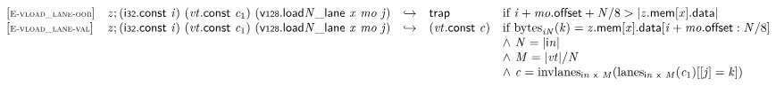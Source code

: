 \vspace{1ex}

$$
\begin{array}{@{}l@{}lcl@{}l@{}}
{[\textsc{\scriptsize E{-}vload\_lane{-}oob}]} \quad & {\mathit{z}} ; (\mathsf{i{\scriptstyle32}}.\mathsf{const}~{\mathit{i}})~({\mathit{vt}}.\mathsf{const}~{\mathit{c}}_{{1}})~({{{\mathsf{v{\scriptstyle128}.load}}{{\mathit{N}}}}{\mathsf{\_}}}{\mathsf{lane}}~{\mathit{x}}~{\mathit{mo}}~{\mathit{j}}) &\hookrightarrow& \mathsf{trap} &\quad
  \mbox{if}~{\mathit{i}} + {\mathit{mo}}.\mathsf{offset} + {\mathit{N}} / 8 > {|{{\mathit{z}}.\mathsf{mem}}{[{\mathit{x}}]}.\mathsf{data}|} \\
{[\textsc{\scriptsize E{-}vload\_lane{-}val}]} \quad & {\mathit{z}} ; (\mathsf{i{\scriptstyle32}}.\mathsf{const}~{\mathit{i}})~({\mathit{vt}}.\mathsf{const}~{\mathit{c}}_{{1}})~({{{\mathsf{v{\scriptstyle128}.load}}{{\mathit{N}}}}{\mathsf{\_}}}{\mathsf{lane}}~{\mathit{x}}~{\mathit{mo}}~{\mathit{j}}) &\hookrightarrow& ({\mathit{vt}}.\mathsf{const}~{\mathit{c}}) &\quad
  \mbox{if}~{{\mathrm{bytes}}}_{{{\mathit{i}}}{{\mathit{N}}}}({\mathit{k}}) = {{\mathit{z}}.\mathsf{mem}}{[{\mathit{x}}]}.\mathsf{data}[{\mathit{i}} + {\mathit{mo}}.\mathsf{offset} : {\mathit{N}} / 8] \\
 &&&&\quad {\land}~{\mathit{N}} = {|{\mathsf{i}}{{\mathit{n}}}|} \\
 &&&&\quad {\land}~{\mathit{M}} = {|{\mathit{vt}}|} / {\mathit{N}} \\
 &&&&\quad {\land}~{\mathit{c}} = {{\mathrm{invlanes}}}_{{\mathsf{i}}{{\mathit{n}}}~\mathsf{x}~{\mathit{M}}}({{\mathrm{lanes}}}_{{\mathsf{i}}{{\mathit{n}}}~\mathsf{x}~{\mathit{M}}}({\mathit{c}}_{{1}})[[{\mathit{j}}] = {\mathit{k}}]) \\
\end{array}
$$

\vspace{1ex}

